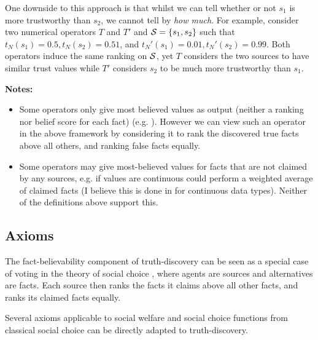 \documentclass[../main.tex]{subfiles}
\begin{document}
One downside to this approach is that whilst we can tell whether or not $s_1$
is more trustworthy than $s_2$, we cannot tell by \emph{how much}.  For
example, consider two numerical operators $T$ and $T'$ and $\S=\{s_1, s_2\}$
such that $t_N(s_1)=0.5, t_N(s_2)=0.51$, and $t_N'(s_1)=0.01,
t_N'(s_2)=0.99$. Both operators induce the same ranking on $\S$, yet $T$
considers the two sources to have similar trust values while $T'$ considers
$s_2$ to be much more trustworthy than $s_1$.

\textbf{Notes:}
\begin{itemize}

\item Some operators only give most believed values as output (neither a
ranking nor belief score for each fact) (e.g. \cite{li_conflicts}). However we
can view such an operator in the above framework by considering it to rank the
discovered true facts above all others, and ranking false facts equally.

\item Some operators may give most-believed values for facts that are not
claimed by any sources, e.g. if values are continuous could perform a weighted
average of claimed facts (I believe this is done in \cite{li_conflicts} for
continuous data types). Neither of the definitions above support this.

\end{itemize}

\subsection{Axioms}
\label{sec:axioms}

The fact-believability component of truth-discovery can be seen as a special
case of voting in the theory of social choice \cite{handbook_voting}, where
agents are sources and alternatives are facts. Each source then ranks the facts
it claims above all other facts, and ranks its claimed facts
equally.\footnotemark



Several axioms applicable to social welfare and social choice functions from
classical social choice can be directly adapted to truth-discovery.
\end{document}
